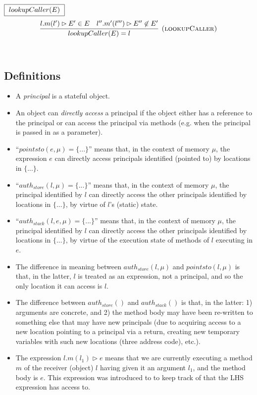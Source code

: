 \documentclass{llncs}
\begin{document}
$\fbox{$~lookupCaller(E)~$}$
\[
\begin{array}{c}
\infer[\textsc{(lookupCaller)}]
  {lookupCaller(E) = l}
  {l.m(l') \rhd E' \in E & l''.m'(l''') \rhd E'' \not\in E'}\\[5ex]

\end{array}
\]


\subsection{Definitions}
\label{sec:definitions}

\begin{itemize}
\item A \textit{principal} is a stateful object.
\item An object can \emph{directly access} a principal if the object either has a reference to the principal or can access the principal via methods (e.g. when the principal is passed in as a parameter).
\item ``$pointsto(e, \mu) = \{ ... \}$'' means that, in the context of memory $\mu$, the expression $e$ can directly access principals identified (pointed to) by locations in $\{ ... \}$.
\item ``$auth_{store}(l, \mu) = \{ ... \}$'' means that, in the context of memory $\mu$, the principal identified by $l$ can directly access the other principals identified by locations in $\{ ... \}$, by virtue of $l$'s (static) state.
\item ``$auth_{stack}(l, e, \mu) = \{ ... \}$'' means that, in the context of memory $\mu$, the principal identified by $l$ can directly access the other principals identified by locations in $\{ ... \}$, by virtue of the execution state of methods of $l$ executing in $e$.
\item The difference in meaning between $auth_{store}(l, \mu)$ and $pointsto(l, \mu)$ is that, in the latter, $l$ is treated as an expression, not a principal, and so the only location it can access is $l$.
\item The difference between $auth_{store}()$ and $auth_{stack}()$ is that, in the latter: 1) arguments are concrete, and 2) the method body may have been re-written to something else that may have new principals (due to acquiring access to a new location pointing to a principal via a return, creating new temporary variables with such new locations (three address code), etc.).
\item The expression $l.m(l_1) \rhd e$ means that we are currently executing a method $m$ of the receiver (object) $l$ having given it an argument $l_1$, and the method body is $e$. This expression was introduced to to keep track of that the LHS expression has access to.

\end{itemize}
\end{document}
